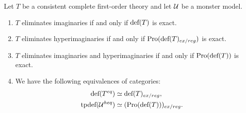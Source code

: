 
    Let $T$ be a consistent complete first-order theory and let $\mathcal{U}$ be a monster model.
    \begin{enumerate}
    \item $T$ eliminates imaginaries if and only if $\textup{def}(T)$ is exact.

    \item $T$ eliminates hyperimaginaries if and only if $\textup{Pro}(\textup{def}(T)_{ex/reg})$ is exact.
        
    \item $T$ eliminates imaginaries and hyperimaginaries if and only if $\textup{Pro}(\textup{def}(T))$ is exact.

    \item We have the following equivalences of categories: 
        \begin{align*}
            \textup{def}(T^{eq}) &\simeq \textup{def}(T)_{ex/reg}, \\
            \textup{tpdef}(\mathcal{U}^{heq}) &\simeq (\textup{Pro}(\textup{def}(T)))_{ex/reg}.
        \end{align*}
    \end{enumerate}

